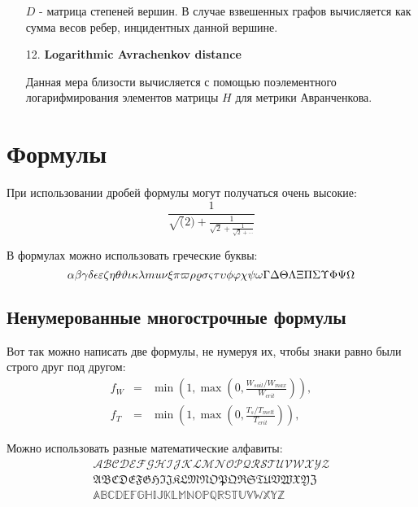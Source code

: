 \begin{itemize}
$D$ - матрица степеней вершин. В случае взвешенных графов вычисляется как сумма весов ребер, инцидентных данной вершине.


\item[12.] \textbf{Logarithmic Avrachenkov distance}

Данная мера близости вычисляется с помощью поэлементного логарифмирования элементов матрицы $H$ для метрики Авранченкова. 

\end{itemize}


\section{Формулы} \label{sect1_4}


При использовании дробей формулы могут получаться очень высокие:
$$
  \frac{1}{\sqrt(2)+
  \displaystyle\frac{1}{\sqrt{2}+
  \displaystyle\frac{1}{\sqrt{2}+\cdots}}}
$$

В формулах можно использовать греческие буквы:
$$
\alpha\beta\gamma\delta\epsilon\varepsilon\zeta\eta\theta\vartheta\iota\kappa\lambda\\mu\nu\xi\pi\varpi\rho\varrho\sigma\varsigma\tau\upsilon\phi\varphi\chi\psi\omega\Gamma\Delta\Theta\Lambda\Xi\Pi\Sigma\Upsilon\Phi\Psi\Omega
$$


\subsection{Ненумерованные многострочные формулы} \label{subsect1_4_2}

Вот так можно написать две формулы, не нумеруя их, чтобы знаки равно были строго друг под другом:
\begin{eqnarray}
  f_W & = & \min \left( 1, \max \left( 0, \frac{W_{soil} / W_{max}}{W_{crit}} \right)  \right), \nonumber \\
  f_T & = & \min \left( 1, \max \left( 0, \frac{T_s / T_{melt}}{T_{crit}} \right)  \right), \nonumber
\end{eqnarray}

Можно использовать разные математические алфавиты:
\begin{eqnarray}
\mathcal{ABCDEFGHIJKLMNOPQRSTUVWXYZ} \nonumber \\
\mathfrak{ABCDEFGHIJKLMNOPQRSTUVWXYZ} \nonumber \\
\mathbb{ABCDEFGHIJKLMNOPQRSTUVWXYZ} \nonumber
\end{eqnarray}

